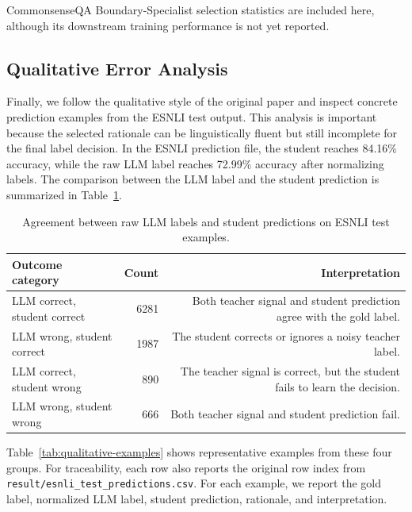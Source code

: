 CommonsenseQA Boundary-Specialist selection statistics are included here, although its downstream training performance is not yet reported.

\subsection{Qualitative Error Analysis}
\label{sec:qualitative-error-analysis}

Finally, we follow the qualitative style of the original paper and inspect concrete prediction examples from the ESNLI test output. This analysis is important because the selected rationale can be linguistically fluent but still incomplete for the final label decision. In the ESNLI prediction file, the student reaches 84.16\% accuracy, while the raw LLM label reaches 72.99\% accuracy after normalizing labels. The comparison between the LLM label and the student prediction is summarized in Table~\ref{tab:esnli-error-counts}.

\begin{table}[H]
\centering
\caption{Agreement between raw LLM labels and student predictions on ESNLI test examples.}
\label{tab:esnli-error-counts}
\begin{tabular}{lrr}
\hline
Outcome category & Count & Interpretation \\
\hline
LLM correct, student correct & 6281 & Both teacher signal and student prediction agree with the gold label. \\
LLM wrong, student correct & 1987 & The student corrects or ignores a noisy teacher label. \\
LLM correct, student wrong & 890 & The teacher signal is correct, but the student fails to learn the decision. \\
LLM wrong, student wrong & 666 & Both teacher signal and student prediction fail. \\
\hline
\end{tabular}
\end{table}

Table~\ref{tab:qualitative-examples} shows representative examples from these four groups. For traceability, each row also reports the original row index from \texttt{result/esnli\_test\_predictions.csv}. For each example, we report the gold label, normalized LLM label, student prediction, rationale, and interpretation.


